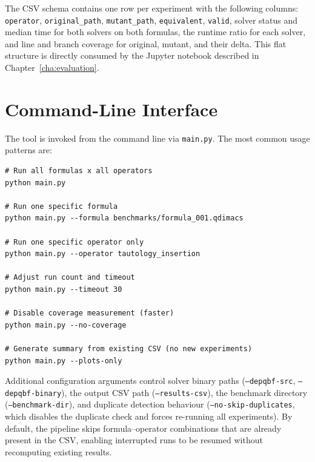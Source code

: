 The CSV schema contains one row per experiment with the following columns: \texttt{operator}, \texttt{original\_path}, \texttt{mutant\_path}, \texttt{equivalent}, \texttt{valid}, solver status and median time 
for both solvers on both formulas, the runtime ratio for each solver, and line and branch coverage for original, mutant, and their delta. This flat structure is directly consumed by the Jupyter notebook described in Chapter~\ref{cha:evaluation}.

\section{Command-Line Interface}\label{sec:cli}

The tool is invoked from the command line via \texttt{main.py}. The most common usage patterns are:

\begin{listing}[H]
\caption{CLI usage examples.}
\label{lst:cli}
\begin{verbatim}
# Run all formulas x all operators
python main.py

# Run one specific formula
python main.py --formula benchmarks/formula_001.qdimacs

# Run one specific operator only
python main.py --operator tautology_insertion

# Adjust run count and timeout
python main.py --timeout 30

# Disable coverage measurement (faster)
python main.py --no-coverage

# Generate summary from existing CSV (no new experiments)
python main.py --plots-only
\end{verbatim}
\end{listing}

Additional configuration arguments control solver binary paths 
(\texttt{--depqbf-src}, \texttt{--depqbf-binary}), the output 
CSV path (\texttt{--results-csv}), the benchmark directory 
(\texttt{--benchmark-dir}), and duplicate detection behaviour (\texttt{--no-skip-duplicates}, which disables the duplicate check and forces re-running all experiments). 
By default, the pipeline skips formula--operator combinations that are already present in the 
CSV, enabling interrupted runs to be resumed without recomputing 
existing results.

